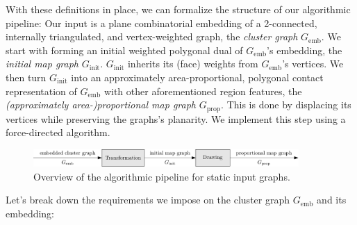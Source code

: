 With these definitions in place, we can formalize the structure of our algorithmic pipeline: Our input is a plane combinatorial embedding of a 2-connected, internally triangulated, and vertex-weighted graph, the \emph{cluster graph} $G_\text{emb}$. We start with forming an initial weighted polygonal dual of $G_\text{emb}$'s embedding, the \emph{initial map graph} $G_\text{init}$. $G_\text{init}$ inherits its (face) weights from $G_\text{emb}$'s vertices. We then turn $G_\text{init}$ into an approximately area-proportional, polygonal contact representation of $G_\text{emb}$ with other aforementioned region features, the \emph{(approximately area-)proportional map graph} $G_\text{prop}$. This is done by displacing its vertices while preserving the graphs's planarity. We implement this step using a force-directed algorithm.


\begin{figure}[H]
	\centering\includegraphics[width=0.9\textwidth]{Resources/Pipeline-Thesis-Static.pdf}
	\caption{Overview of the algorithmic pipeline for static input graphs.}
	\label{fig:static-pipeline-thesis}
\end{figure}

Let's break down the requirements we impose on the cluster graph $G_\text{emb}$ and its embedding:

